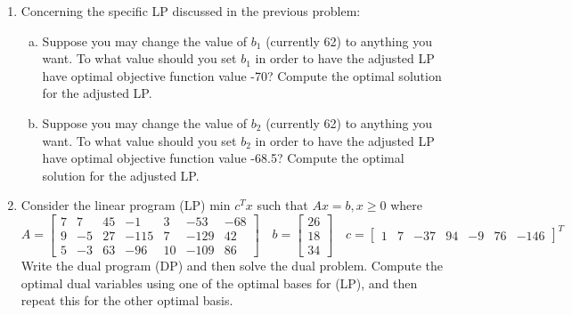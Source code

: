 \documentclass{article}
\begin{document}
\begin{enumerate}
	\item Concerning the specific LP discussed in the previous problem:

		\begin{enumerate}[a)]
			\item Suppose you may change the value of $b_1$ (currently 62) to anything you want. To what value should you set $b_1$ in order to have the adjusted LP have optimal objective function value -70? Compute the optimal solution for the adjusted LP.

			\item Suppose you may change the value of $b_2$ (currently 62) to anything you want. To what value should you set $b_2$ in order to have the adjusted LP have optimal objective function value -68.5? Compute the optimal solution for the adjusted LP.

		\end{enumerate}

	\item Consider the linear program (LP) min $c^T x$ such that $Ax=b, x\ge 0$ where \[ A=\begin{bmatrix}
				7 & 7 & 45 & -1 & 3 & -53 & -68 \\
				9 & -5 & 27 & -115 & 7 & -129 & 42 \\
				5 & -3 & 63 & -96 & 10 & -109 & 86
			\end{bmatrix}\quad b=\begin{bmatrix}
				26 \\ 18 \\ 34
			\end{bmatrix}\quad c=\begin{bmatrix}
				1 & 7 & -37 & 94 & -9 & 76 & -146
		\end{bmatrix}^T\] Write the dual program (DP) and then solve the dual problem. Compute the optimal dual variables using one of the optimal bases for (LP), and then repeat this for the other optimal basis.

\end{enumerate}
\end{document}
